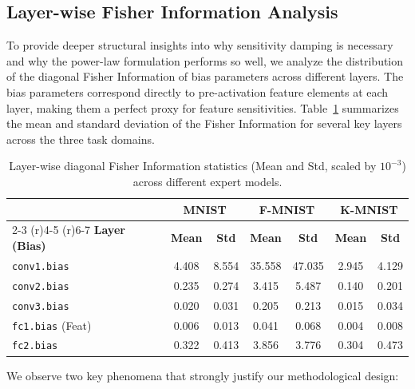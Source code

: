 \documentclass{article}
\theoremstyle{plain}
\theoremstyle{definition}
\theoremstyle{remark}
\begin{document}
\subsection{Layer-wise Fisher Information Analysis}
To provide deeper structural insights into why sensitivity damping is necessary and why the power-law formulation performs so well, we analyze the distribution of the diagonal Fisher Information of bias parameters across different layers. The bias parameters correspond directly to pre-activation feature elements at each layer, making them a perfect proxy for feature sensitivities. Table~\ref{tab:fisher_analysis} summarizes the mean and standard deviation of the Fisher Information for several key layers across the three task domains.

\begin{table}[t]
\caption{Layer-wise diagonal Fisher Information statistics (Mean and Std, scaled by $10^{-3}$) across different expert models.}
\label{tab:fisher_analysis}
\vskip 0.15in
\begin{center}
\begin{small}
\begin{tabular}{lcccccc}
\toprule
 & \multicolumn{2}{c}{\textbf{MNIST}} & \multicolumn{2}{c}{\textbf{F-MNIST}} & \multicolumn{2}{c}{\textbf{K-MNIST}} \\
\cmidrule(r){2-3} \cmidrule(r){4-5} \cmidrule(r){6-7}
\textbf{Layer (Bias)} & \textbf{Mean} & \textbf{Std} & \textbf{Mean} & \textbf{Std} & \textbf{Mean} & \textbf{Std} \\
\midrule
\texttt{conv1.bias} & 4.408 & 8.554 & 35.558 & 47.035 & 2.945 & 4.129 \\
\texttt{conv2.bias} & 0.235 & 0.274 & 3.415 & 5.487 & 0.140 & 0.201 \\
\texttt{conv3.bias} & 0.020 & 0.031 & 0.205 & 0.213 & 0.015 & 0.034 \\
\texttt{fc1.bias} (Feat) & 0.006 & 0.013 & 0.041 & 0.068 & 0.004 & 0.008 \\
\texttt{fc2.bias} & 0.322 & 0.413 & 3.856 & 3.776 & 0.304 & 0.473 \\
\bottomrule
\end{tabular}
\end{small}
\end{center}
\vskip -0.1in
\end{table}

We observe two key phenomena that strongly justify our methodological design:
\end{document}
